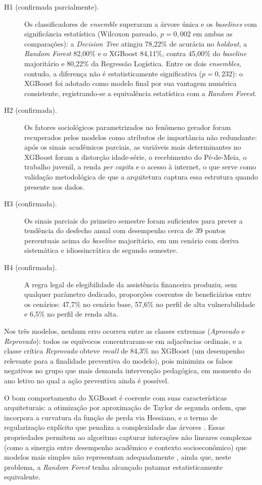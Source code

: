 \begin{description}
    \item[H1 (confirmada parcialmente).] Os classificadores de \textit{ensemble} superaram a árvore única e os \textit{baselines} com significância estatística (Wilcoxon pareado, $p = 0{,}002$ em ambas as comparações): a \textit{Decision Tree} atingiu 78,22\% de acurácia no \textit{holdout}, a \textit{Random Forest} 82,00\% e o XGBoost 84,11\%, contra 45,00\% do \textit{baseline} majoritário e 80,22\% da Regressão Logística. Entre os dois \textit{ensembles}, contudo, a diferença não é estatisticamente significativa ($p = 0{,}232$): o XGBoost foi adotado como modelo final por sua vantagem numérica consistente, registrando-se a equivalência estatística com a \textit{Random Forest}.
    \item[H2 (confirmada).] Os fatores sociológicos parametrizados no fenômeno gerador foram recuperados pelos modelos como atributos de importância não redundante: após os sinais acadêmicos parciais, as variáveis mais determinantes no XGBoost foram a distorção idade-série, o recebimento do Pé-de-Meia, o trabalho juvenil, a renda \textit{per capita} e o acesso à internet, o que serve como validação metodológica de que a arquitetura captura essa estrutura quando presente nos dados.
    \item[H3 (confirmada).] Os sinais parciais do primeiro semestre foram suficientes para prever a tendência do desfecho anual com desempenho cerca de 39 pontos percentuais acima do \textit{baseline} majoritário, em um cenário com deriva sistemática e idiossincrática de segundo semestre.
    \item[H4 (confirmada).] A regra legal de elegibilidade da assistência financeira produziu, sem qualquer parâmetro dedicado, proporções coerentes de beneficiários entre os cenários: 47,7\% no cenário base, 57,6\% no perfil de alta vulnerabilidade e 6,5\% no perfil de renda alta.
\end{description}

Nos três modelos, nenhum erro ocorreu entre as classes extremas (\textit{Aprovado} e \textit{Reprovado}): todos os equívocos concentraram-se em adjacências ordinais, e a classe crítica \textit{Reprovado} obteve \textit{recall} de 84,3\% no XGBoost (um desempenho relevante para a finalidade preventiva do modelo), pois minimiza os falsos negativos no grupo que mais demanda intervenção pedagógica, em momento do ano letivo no qual a ação preventiva ainda é possível.

O bom comportamento do XGBoost é coerente com suas características arquiteturais: a otimização por aproximação de Taylor de segunda ordem, que incorpora a curvatura da função de perda via Hessiano, e o termo de regularização explícito que penaliza a complexidade das árvores \cite{chen2016}. Essas propriedades permitem ao algoritmo capturar interações não lineares complexas (como a sinergia entre desempenho acadêmico e contexto socioeconômico) que modelos mais simples não representam adequadamente \cite{friedman2001}, ainda que, neste problema, a \textit{Random Forest} tenha alcançado patamar estatisticamente equivalente.

